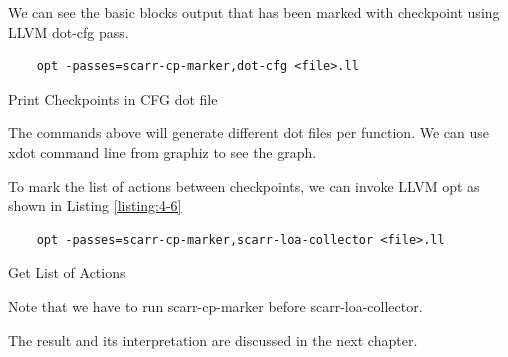We can see the basic blocks output that has been marked with checkpoint using LLVM dot-cfg pass.

\begin{listing}
\begin{verbatim}
    opt -passes=scarr-cp-marker,dot-cfg <file>.ll
\end{verbatim}
\caption{Print Checkpoints in CFG dot file}    
\label{listing:4-5}
\end{listing}

The commands above will generate different dot files per function. We can use xdot command line from graphiz to see the graph. 

To mark the list of actions between checkpoints, we can invoke LLVM opt as shown in Listing \ref{listing:4-6}

\begin{listing}
\begin{verbatim}
    opt -passes=scarr-cp-marker,scarr-loa-collector <file>.ll
\end{verbatim}
\caption{Get List of Actions}    
\label{listing:4-6}
\end{listing}

Note that we have to run scarr-cp-marker before scarr-loa-collector.

The result and its interpretation are discussed in the next chapter.